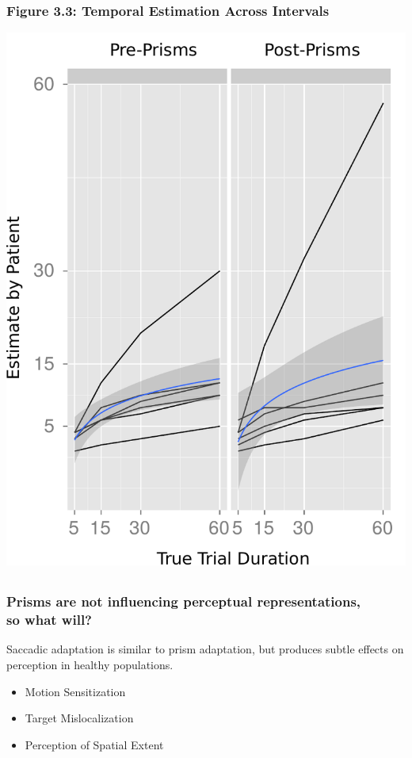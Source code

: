 \documentclass{beamer}
\begin{document}

\subsection*{}
\begin{frame}
	\frametitle{Prisms are not influencing perceptual representations, \\ so what will?}
	Saccadic adaptation is similar to prism adaptation, but produces subtle effects on perception in healthy populations.
	\begin{itemize}
		\item Motion Sensitization
		\item Target Mislocalization
		\item Perception of Spatial Extent
	\end{itemize}
\end{frame}
\end{document}
